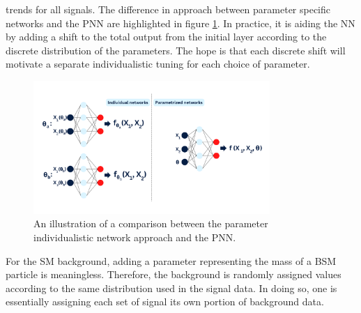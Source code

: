 trends for all signals. The difference in approach between parameter specific networks and the \ac{PNN} are highlighted in figure \ref{fig:PNN}.
In practice, it is aiding the \ac{NN} by adding a shift to the total output from the initial layer according to the discrete distribution of the 
parameters. The hope is that each discrete shift will motivate a separate individualistic tuning for each choice of parameter. 
\begin{figure}
    \centering
    \includegraphics[width=0.8\textwidth]{Figures/Illustrations/PNN.png}
    \vspace{-.8cm}
    \caption{An illustration of a comparison between the parameter individualistic network 
    approach and the \acs{PNN}.}
    \label{fig:PNN}
\end{figure}
For the \ac{SM} background, adding a parameter representing the mass of a \ac{BSM} particle is meaningless. 
Therefore, the background is randomly assigned values according to the same distribution used in the signal data. 
In doing so, one is essentially assigning each set of signal its own portion of background data. 